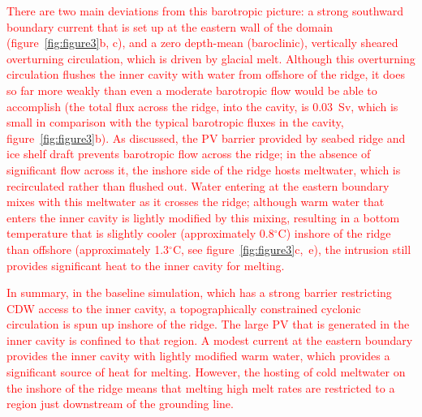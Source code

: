 \documentclass[draft]{agujournal2019}
\newcommand{\red}[1]{\textcolor{red}{#1}}
\begin{document}
\red{There are two main deviations from this barotropic picture: a strong southward boundary current that is set up at the eastern wall of the domain (figure~\ref{fig:figure3}b, c), and a zero depth-mean (baroclinic), vertically sheared overturning circulation, which is driven by glacial melt. Although this overturning circulation flushes the inner cavity with water from offshore of the ridge, it does so far more weakly than even a moderate barotropic flow would be able to accomplish (the total flux across the ridge, into the cavity, is 0.03~Sv, which is small in comparison with the typical barotropic fluxes in the cavity, figure~\ref{fig:figure3}b). As discussed, the PV barrier provided by seabed ridge and ice shelf draft prevents barotropic flow across the ridge; in the absence of significant flow across it, the inshore side of the ridge hosts meltwater, which is recirculated rather than flushed out. Water entering at the eastern boundary mixes with this meltwater as it crosses the ridge; although warm water that enters the inner cavity is lightly modified by this mixing, resulting in a bottom temperature that is slightly cooler (approximately 0.8${}^\circ$C) inshore of the ridge than offshore (approximately 1.3${}^\circ$C, see figure~\ref{fig:figure3}c,~e), the intrusion still provides significant heat to the inner cavity for melting.}

\red{In summary, in the baseline simulation, which has a strong barrier restricting CDW access to the inner cavity, a topographically constrained cyclonic circulation is spun up inshore of the ridge. The large PV that is generated in the inner cavity is confined to that region. A modest current at the eastern boundary provides the inner cavity with lightly modified warm water, which provides a significant source of heat for melting. However, the hosting of cold meltwater on the inshore of the ridge means that melting high melt rates are restricted to a region just downstream of the grounding line.}


\end{document}
